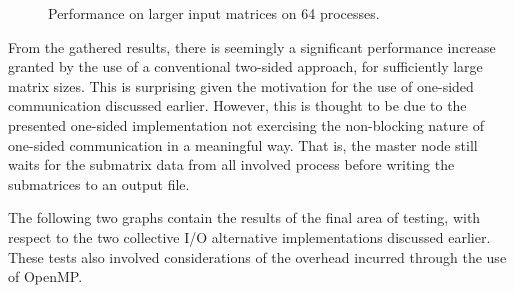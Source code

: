 \documentclass[journal,10pt,a4paper]{IEEEtran}
\begin{document}
\begin{figure}[H]
    \centering
    \caption{Performance on larger input matrices on 64 processes.}
    \label{fig:big1}
\end{figure}



 From the gathered results, there is seemingly a significant performance increase granted by the use of a conventional two-sided approach, for sufficiently large matrix sizes. This is surprising given the motivation for the use of one-sided communication discussed earlier. However, this is thought to be due to the presented one-sided implementation not exercising the non-blocking nature of one-sided communication in a meaningful way. That is, the master node still waits for the submatrix data from all involved process before writing the submatrices to an output file.

The following two graphs contain the results of the final area of testing, with respect to the two collective I/O alternative implementations discussed earlier. These tests also involved considerations of the overhead incurred through the use of OpenMP.
\end{document}

